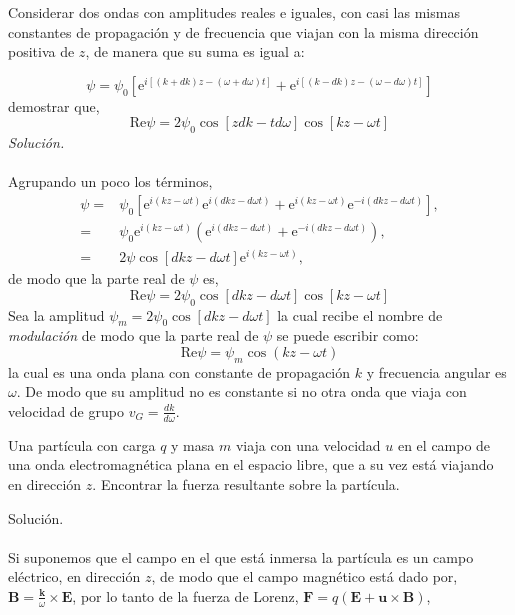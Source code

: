 \documentclass[11pt,fleqn]{book} %
\begin{document}
\begin{example}
Considerar dos ondas con amplitudes reales e iguales, con casi las mismas constantes de propagaci\'on y de frecuencia que viajan con la misma direcci\'on positiva de $z$, de manera que su suma es igual a:

\begin{equation*}
 \psi=\psi_0 [\text{e}^{i[(k+dk)z-(\omega+d\omega)t]}+ \text{e}^{i[(k-dk)z-(\omega-d\omega)t]}]
 \end{equation*}
demostrar que,
\begin{equation*}
\text{Re} \psi=2\psi_0\cos[zdk-td\omega]\cos[kz-\omega t]
\end{equation*}
\textit{Soluci\'on.} \\\\
Agrupando un poco los t\'erminos,
\begin{equation*}
\begin{split}
\psi=&\psi_0\left[ \text{e}^{i(kz-\omega t)}\text{e}^{i(dkz-d\omega t)} + \text{e}^{i(kz-\omega t)}\text{e}^{-i(dkz-d\omega t)} \right],\\
=&\psi_0 \text{e}^{i(kz-\omega t)}\left( \text{e}^{i(dkz-d\omega t)}+\text{e}^{-i(dkz-d\omega t)} \right),\\
=&2\psi\cos[dkz-d\omega t] \text{e}^{i(kz-\omega t)},
\end{split}
\end{equation*}
de modo que la parte real de $\psi$ es,
\begin{equation*}
\text{Re} \psi=2\psi_0\cos[dkz-d\omega t]\cos[kz-\omega t]
\end{equation*}
Sea la amplitud $\psi_m=2\psi_0\cos[dkz-d\omega t]$ la cual recibe el nombre de \textit{modulaci\'on} de modo que la parte real de $\psi$ se puede escribir como:
\begin{equation*}
 \text{Re} \psi=\psi_m\cos(kz-\omega t)
 \end{equation*}
la cual es una onda plana con constante de propagaci\'on $k$ y frecuencia angular es $\omega$. De modo que su amplitud no es constante si no otra onda que viaja con velocidad de grupo $v_G=\frac{dk}{d\omega}$.
\end{example}


\begin{example}
Una part\'icula con carga $q$ y masa $m$ viaja con una velocidad $u$ en el campo de una onda electromagn\'etica plana en el espacio libre, que a su vez est\'a viajando en direcci\'on $z$. Encontrar la fuerza resultante sobre la part\'icula.
\end{example}
Soluci\'on.\\\\
Si suponemos que el campo en el que est\'a inmersa la part\'icula es un campo el\'ectrico, en direcci\'on $z$, de modo que el campo magn\'etico est\'a dado por, $\textbf{B}=\frac{\textbf{k}}{\omega}\times\textbf{E}$, por lo tanto de la fuerza de Lorenz, $\textbf{F}=q(\textbf{E}+\textbf{u}\times\textbf{B})$,
\end{document}
